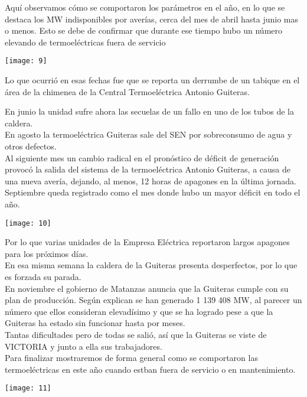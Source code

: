 \documentclass{article}
\begin{document}
\vspace{1cm}

Aquí observamos cómo se comportaron los parámetros en el año, en lo que se destaca los MW indisponibles por averías, cerca del mes de abril hasta junio mas o menos. Esto se debe de confirmar que durante ese tiempo hubo un número elevando de termoeléctricas fuera de servicio\\

\vspace{0.5cm}
\begin{center}
   \texttt{[image: 9]}\\ 
\end{center}

\vspace{0.5cm}

Lo que ocurrió en esas fechas fue que se reporta un derrumbe de un tabique en el área de la chimenea de la Central Termoeléctrica Antonio Guiteras.\\

\vspace{0.5cm}

En junio la unidad sufre ahora las secuelas de un fallo en uno de los tubos de la caldera.\\
En agosto la termoeléctrica Guiteras sale del SEN por sobreconsumo de agua y otros defectos.\\
Al siguiente mes un cambio radical en el pronóstico de déficit de generación provocó la salida del sistema de la termoeléctrica Antonio Guiteras, a causa de una nueva avería, dejando, al menos, 12 horas de apagones en la última jornada. Septiembre queda registrado como el mes donde hubo un mayor déficit en todo el año.\\

\vspace{0.5cm}
\begin{center}
    \texttt{[image: 10]}
\end{center}

\vspace{0.5cm}

Por lo que varias unidades de la Empresa Eléctrica reportaron largos apagones para los próximos días.\\
En esa misma semana la caldera de la Guiteras presenta desperfectos, por lo que es forzada su parada. \\
En noviembre el gobierno de Matanzas anuncia que la Guiteras cumple con su plan de producción. Según explican se han generado 1 139 408 MW, al parecer un número que ellos consideran elevadísimo y que se ha logrado pese a que la Guiteras ha estado sin funcionar hasta por meses.\\
Tantas dificultades pero de todas se salió, así que la Guiteras se viste de VICTORIA y junto a ella sus trabajadores.\\
Para finalizar mostraremos de forma general como se comportaron las termoeléctricas en este año cuando estban fuera de servicio o en mantenimiento.\\

\vspace{0.5cm}
\begin{center}
    \texttt{[image: 11]}
\end{center}
\end{document}

